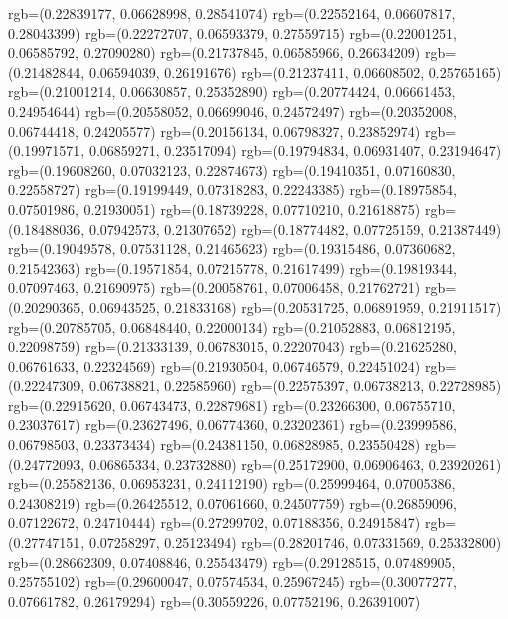 {{        rgb=(0.22839177, 0.06628998, 0.28541074)
        rgb=(0.22552164, 0.06607817, 0.28043399)
        rgb=(0.22272707, 0.06593379, 0.27559715)
        rgb=(0.22001251, 0.06585792, 0.27090280)
        rgb=(0.21737845, 0.06585966, 0.26634209)
        rgb=(0.21482844, 0.06594039, 0.26191676)
        rgb=(0.21237411, 0.06608502, 0.25765165)
        rgb=(0.21001214, 0.06630857, 0.25352890)
        rgb=(0.20774424, 0.06661453, 0.24954644)
        rgb=(0.20558052, 0.06699046, 0.24572497)
        rgb=(0.20352008, 0.06744418, 0.24205577)
        rgb=(0.20156134, 0.06798327, 0.23852974)
        rgb=(0.19971571, 0.06859271, 0.23517094)
        rgb=(0.19794834, 0.06931407, 0.23194647)
        rgb=(0.19608260, 0.07032123, 0.22874673)
        rgb=(0.19410351, 0.07160830, 0.22558727)
        rgb=(0.19199449, 0.07318283, 0.22243385)
        rgb=(0.18975854, 0.07501986, 0.21930051)
        rgb=(0.18739228, 0.07710210, 0.21618875)
        rgb=(0.18488036, 0.07942573, 0.21307652)
        rgb=(0.18774482, 0.07725159, 0.21387449)
        rgb=(0.19049578, 0.07531128, 0.21465623)
        rgb=(0.19315486, 0.07360682, 0.21542363)
        rgb=(0.19571854, 0.07215778, 0.21617499)
        rgb=(0.19819344, 0.07097463, 0.21690975)
        rgb=(0.20058761, 0.07006458, 0.21762721)
        rgb=(0.20290365, 0.06943525, 0.21833168)
        rgb=(0.20531725, 0.06891959, 0.21911517)
        rgb=(0.20785705, 0.06848440, 0.22000134)
        rgb=(0.21052883, 0.06812195, 0.22098759)
        rgb=(0.21333139, 0.06783015, 0.22207043)
        rgb=(0.21625280, 0.06761633, 0.22324569)
        rgb=(0.21930504, 0.06746579, 0.22451024)
        rgb=(0.22247309, 0.06738821, 0.22585960)
        rgb=(0.22575397, 0.06738213, 0.22728985)
        rgb=(0.22915620, 0.06743473, 0.22879681)
        rgb=(0.23266300, 0.06755710, 0.23037617)
        rgb=(0.23627496, 0.06774360, 0.23202361)
        rgb=(0.23999586, 0.06798503, 0.23373434)
        rgb=(0.24381150, 0.06828985, 0.23550428)
        rgb=(0.24772093, 0.06865334, 0.23732880)
        rgb=(0.25172900, 0.06906463, 0.23920261)
        rgb=(0.25582136, 0.06953231, 0.24112190)
        rgb=(0.25999464, 0.07005386, 0.24308219)
        rgb=(0.26425512, 0.07061660, 0.24507759)
        rgb=(0.26859096, 0.07122672, 0.24710444)
        rgb=(0.27299702, 0.07188356, 0.24915847)
        rgb=(0.27747151, 0.07258297, 0.25123494)
        rgb=(0.28201746, 0.07331569, 0.25332800)
        rgb=(0.28662309, 0.07408846, 0.25543479)
        rgb=(0.29128515, 0.07489905, 0.25755102)
        rgb=(0.29600047, 0.07574534, 0.25967245)
        rgb=(0.30077277, 0.07661782, 0.26179294)
        rgb=(0.30559226, 0.07752196, 0.26391007)
}}
